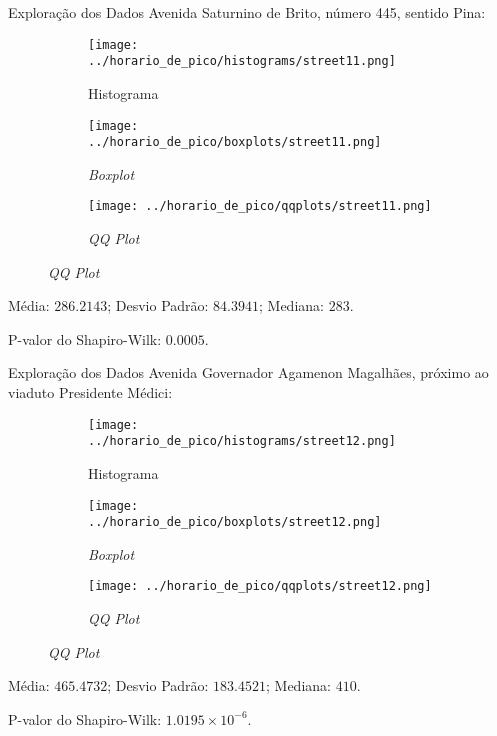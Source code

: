 \begin{frame}{Exploração dos Dados}
Avenida Saturnino de Brito, número 445, sentido Pina:
\vskip 0.05cm
\begin{figure}
	\centering
	\begin{subfigure}{.33\textwidth}
		\centering
		\texttt{[image: ../horario\_de\_pico/histograms/street11.png]}
		\caption*{Histograma}
	\end{subfigure}%
	\begin{subfigure}{.33\textwidth}
		\centering
		\texttt{[image: ../horario\_de\_pico/boxplots/street11.png]}
		\caption*{\textit{Boxplot}}
	\end{subfigure}
	\begin{subfigure}{.32\textwidth}
		\centering
		\texttt{[image: ../horario\_de\_pico/qqplots/street11.png]}
		\caption*{\textit{QQ Plot}}
	\end{subfigure}
\end{figure}
\vskip 0.05cm
Média: $286.2143$; Desvio Padrão: $84.3941$; Mediana: $283$.

P-valor do Shapiro-Wilk: $0.0005$.
\end{frame}

\begin{frame}{Exploração dos Dados}
Avenida Governador Agamenon Magalhães, próximo ao viaduto Presidente Médici:
\begin{figure}
	\centering
	\begin{subfigure}{.33\textwidth}
		\centering
		\texttt{[image: ../horario\_de\_pico/histograms/street12.png]}
		\caption*{Histograma}
	\end{subfigure}%
	\begin{subfigure}{.33\textwidth}
		\centering
		\texttt{[image: ../horario\_de\_pico/boxplots/street12.png]}
		\caption*{\textit{Boxplot}}
	\end{subfigure}
	\begin{subfigure}{.32\textwidth}
		\centering
		\texttt{[image: ../horario\_de\_pico/qqplots/street12.png]}
		\caption*{\textit{QQ Plot}}
	\end{subfigure}
\end{figure}
Média: $465.4732$; Desvio Padrão: $183.4521$; Mediana: $410$.

P-valor do Shapiro-Wilk: $1.0195 \times 10^{-6}$.
\end{frame}

